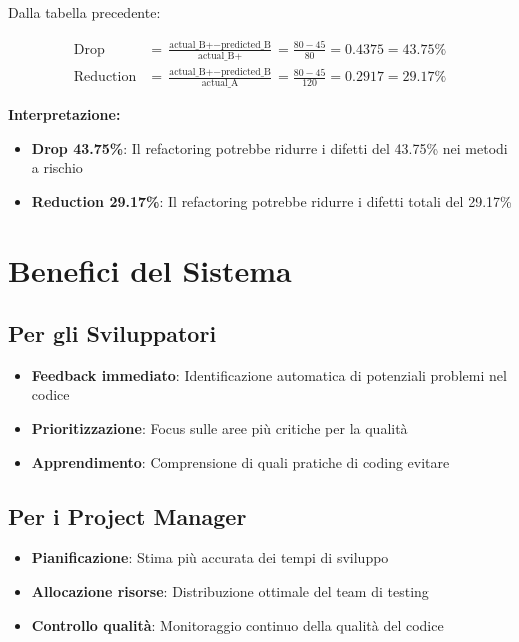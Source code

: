 \documentclass[12pt,a4paper]{article}
\begin{document}
Dalla tabella precedente:

\begin{align}
\text{Drop} &= \frac{\text{actual\_B+} - \text{predicted\_B}}{\text{actual\_B+}} = \frac{80 - 45}{80} = 0.4375 = 43.75\% \\
\text{Reduction} &= \frac{\text{actual\_B+} - \text{predicted\_B}}{\text{actual\_A}} = \frac{80 - 45}{120} = 0.2917 = 29.17\%
\end{align}

\textbf{Interpretazione:}
\begin{itemize}
    \item \textbf{Drop 43.75\%}: Il refactoring potrebbe ridurre i difetti del 43.75\% nei metodi a rischio
    \item \textbf{Reduction 29.17\%}: Il refactoring potrebbe ridurre i difetti totali del 29.17\%
\end{itemize}

\section{Benefici del Sistema}

\subsection{Per gli Sviluppatori}

\begin{itemize}
    \item \textbf{Feedback immediato}: Identificazione automatica di potenziali problemi nel codice
    \item \textbf{Prioritizzazione}: Focus sulle aree più critiche per la qualità
    \item \textbf{Apprendimento}: Comprensione di quali pratiche di coding evitare
\end{itemize}

\subsection{Per i Project Manager}

\begin{itemize}
    \item \textbf{Pianificazione}: Stima più accurata dei tempi di sviluppo
    \item \textbf{Allocazione risorse}: Distribuzione ottimale del team di testing
    \item \textbf{Controllo qualità}: Monitoraggio continuo della qualità del codice
\end{itemize}
\end{document}
